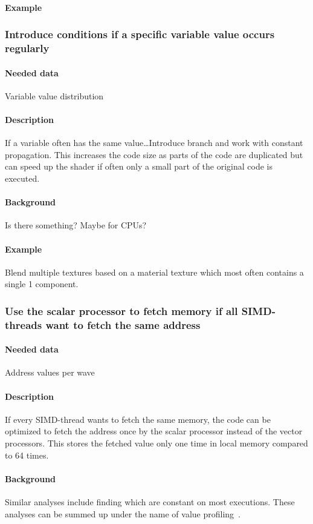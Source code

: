 \paragraph{Example}
	
\subsubsection{Introduce conditions if a specific variable value occurs regularly}
\paragraph{Needed data} Variable value distribution
\paragraph{Description} If a variable often has the same value\dots Introduce branch and work with constant propagation. This increases the code size as parts of the code are duplicated but can speed up the shader if often only a small part of the original code is executed.
\paragraph{Background} Is there something? Maybe for CPUs?
\paragraph{Example} Blend multiple textures based on a material texture which most often contains a single 1 component.
	
\subsubsection{Use the scalar processor to fetch memory if all SIMD-threads want to fetch the same address}
\paragraph{Needed data} Address values per wave
\paragraph{Description} If every SIMD-thread wants to fetch the same memory, the code can be optimized to fetch the address once by the scalar processor instead of the vector processors. This stores the fetched value only one time in local memory compared to 64 times.
\paragraph{Background} Similar analyses include finding which are constant on most executions. These analyses can be summed up under the name of value profiling~\cite{Calder1997}.

